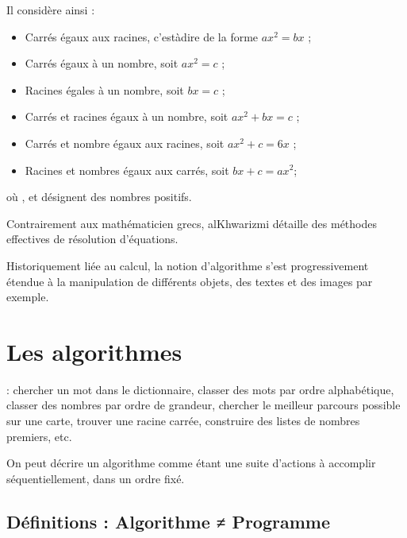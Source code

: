 \documentclass[letterpaper,10pt,english]{sphinxmanual}
\begin{document}
Il considère ainsi :
\begin{itemize}
\item {} 
Carrés égaux aux racines, c’est\sphinxhyphen{}à\sphinxhyphen{}dire de la forme \(ax^2 = bx\) ;

\item {} 
Carrés égaux à un nombre, soit \(ax^2 = c\) ;

\item {} 
Racines égales à un nombre, soit \(bx = c\) ;

\item {} 
Carrés et racines égaux à un nombre, soit \(ax^2 + bx = c\) ;

\item {} 
Carrés et nombre égaux aux racines, soit \(ax^2 + c = 6x\) ;

\item {} 
Racines et nombres égaux aux carrés, soit \(bx + c = ax^2\);

\end{itemize}

où , et  désignent des nombres positifs.

Contrairement aux mathématicien grecs, al\sphinxhyphen{}Khwarizmi détaille des méthodes effectives de résolution d’équations.

Historiquement liée au calcul, la notion d’algorithme s’est progressivement étendue à la manipulation de différents objets, des textes et des images par exemple.


\chapter{Les algorithmes}
\label{\detokenize{src/OCI_HS1_Algorithmes:les-algorithmes}}
 : chercher un mot dans le dictionnaire, classer des mots par ordre alphabétique, classer des nombres par ordre de grandeur, chercher le meilleur parcours possible sur une carte, trouver une racine carrée, construire des listes de nombres premiers, etc.

On peut décrire un algorithme comme étant une suite d’actions à accomplir séquentiellement, dans un ordre fixé.


\section{Définitions :  Algorithme ≠ Programme}
\label{\detokenize{src/OCI_HS1_Algorithmes:definitions-algorithme-programme}}
\end{document}
